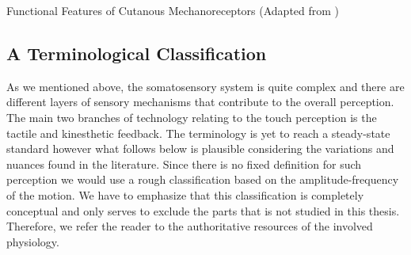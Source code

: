 %
\begin{table}%
\centering
\caption[Functional Features of Cutanous Mechanoreceptors]{Functional Features of Cutanous Mechanoreceptors (Adapted from \cite{idareview})}
{\tiny
{}
}%
\label{tab:mechano}
\end{table}
\subsection{A Terminological Classification}

As we mentioned above, the somatosensory system is quite complex and there are different layers of sensory mechanisms that contribute to the overall perception. The main two branches of technology relating to the touch perception is the tactile and kinesthetic  feedback. The terminology is yet to reach a steady-state standard however what follows below is plausible considering the variations and nuances found in the literature. Since there is no fixed definition for such perception we would use a rough  classification based on the amplitude-frequency of the motion. We have to emphasize that this classification is completely conceptual and only serves to exclude the parts that is not studied in this thesis. Therefore, we refer the reader to the authoritative resources of the involved physiology. 

